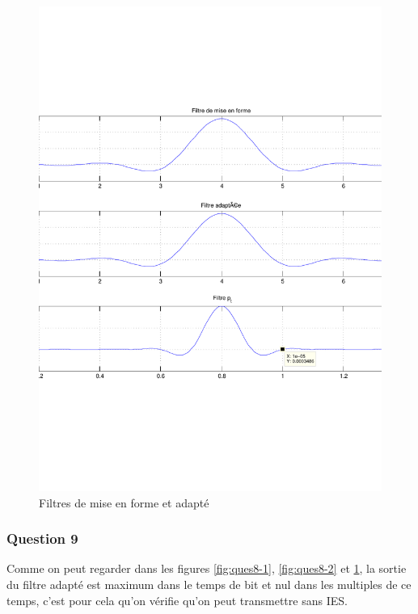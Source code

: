 \documentclass[a4paper,11pt]{article}
\begin{document}
\begin{figure}
	\begin{center}
	\includegraphics[scale=0.5]{Q8-3.pdf}
	\caption{Filtres de mise en forme et adapté}
	\label{fig:ques8-3}
	\end{center}
\end{figure} 


\subsubsection*{Question 9}
Comme on peut regarder dans les figures \ref{fig:ques8-1}, \ref{fig:ques8-2} et \ref{fig:ques8-3}, la sortie du filtre adapté est maximum dans le temps de bit et nul dans les multiples de ce temps, c'est pour cela qu'on vérifie qu'on peut transmettre sans IES.
\end{document}
